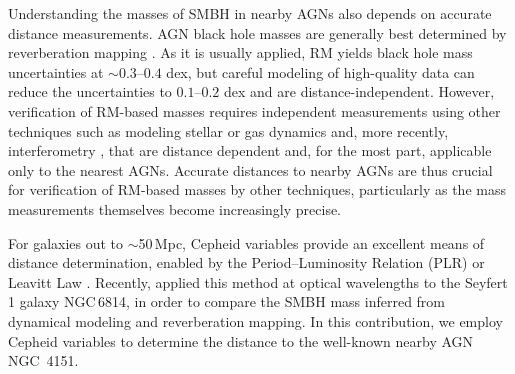 \documentclass[twocolumn]{aastex63}
\newcommand{\ngs}{NGC\ 4151}
\begin{document}
Understanding the masses of SMBH in nearby AGNs also depends on accurate distance measurements.  AGN black hole masses are generally best determined by reverberation mapping \citep[RM;][]{Peterson2014}. As it is usually applied, RM yields black hole mass uncertainties at $\sim0.3$--$0.4$ dex, but careful modeling of high-quality data can reduce the uncertainties to $0.1$--$0.2$ dex \citep{Pancoast2014b,Grier2017} and are distance-independent.  However, verification of RM-based masses requires independent measurements using other techniques such as modeling stellar or gas dynamics and, more recently, interferometry \citep{Sturm2018}, that are distance dependent and, for the most part, applicable only to the nearest AGNs. Accurate distances to nearby AGNs are thus crucial for verification of RM-based masses by other techniques, particularly as the mass measurements themselves become increasingly precise.

For galaxies out to $\sim$50\,Mpc, Cepheid variables provide an excellent means of distance determination, enabled by the Period--Luminosity Relation (PLR) or Leavitt Law \citep{Leavitt1912}. Recently, \citet{Bentz2019} applied this method at optical wavelengths to the  Seyfert 1 galaxy NGC$\,$6814, in order to compare the SMBH mass inferred from dynamical modeling and reverberation mapping.  In this contribution, we employ Cepheid variables to determine the distance to the well-known nearby AGN \ngs.
\end{document}
